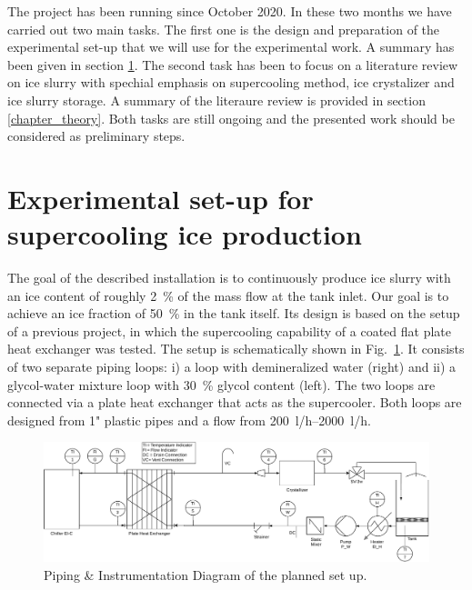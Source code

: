 \documentclass[english]{SFOEYearlyReportEnglish_2018}
\begin{document}
The project has been running since October 2020. In these two months we have carried out two main tasks. The first one is the design and preparation of the experimental set-up that we will use for the experimental work. A summary has been given in section \ref{chapter_exp_setup}. The second task has been to focus on a literature review on ice slurry with spechial emphasis on supercooling method, ice crystalizer and ice slurry storage. A summary of the literaure review is provided in section \ref{chapter_theory}. Both tasks are still ongoing and the presented work should be considered as preliminary steps.
 

\section{Experimental set-up for supercooling ice production}
\label{chapter_exp_setup}


\noindent
 The goal of the described installation is to continuously produce ice slurry with an ice content of roughly 2~\% of the mass flow at the tank inlet. Our goal is to achieve an ice fraction of 50~\% in the tank itself. Its design is based on the setup of a previous project, in which the supercooling capability of a coated flat plate heat exchanger was tested. The setup is schematically shown in Fig.~\ref{fig:exp_setup}. It consists of two separate piping loops: i) a loop with demineralized water (right) and ii) a glycol-water mixture loop with 30~\% glycol content (left). The two loops are connected via a plate heat exchanger that acts as the supercooler. Both loops are designed from 1" plastic pipes and a flow from \SIrange{200}{2000}{l/h}.

\begin{figure}[!htbp]
    \centering
    \includegraphics[trim={0 0 0 0},clip,width=\textwidth]{figures/SetUp_v01.pdf}
    \caption{Piping \& Instrumentation Diagram of the planned set up.}
   \label{fig:exp_setup}
\end{figure}
\end{document}
